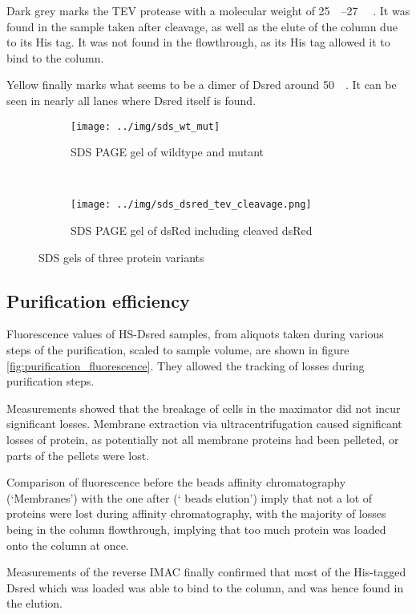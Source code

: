 Dark grey marks the TEV protease with a molecular weight of
\SIrange{25}{27}{\kilo\Da} \cite{pdb}. It was found in the sample taken after
cleavage, as well as the elute of the column due to its His tag. It was not
found in the flowthrough, as its His tag allowed it to bind to the column.

Yellow finally marks what seems to be a dimer of Dsred around
\SI{50}{\kilo\Da}. It can be seen in nearly all lanes where Dsred itself is
found.

\begin{figure*}
    \centering
    \begin{subfigure}{0.45\textwidth}
        \texttt{[image: ../img/sds\_wt\_mut]}
        \caption{SDS PAGE gel of wildtype and mutant}
        \label{fig:sds_wt_mut}
    \end{subfigure}
    ~
    \begin{subfigure}{0.45\textwidth}
        \texttt{[image: ../img/sds\_dsred\_tev\_cleavage.png]}
        \caption{SDS PAGE gel of dsRed including cleaved dsRed}
        \label{fig:sds_dsred_cleaved}
    \end{subfigure}
    \caption{SDS gels of three protein variants}
    \label{fig:sds}
\end{figure*}

\subsection{Purification efficiency}

Fluorescence values of HS-Dsred samples, from aliquots taken during various
steps of the purification, scaled to sample volume, are shown in figure
\ref{fig:purification_fluorescence}. They allowed the tracking of losses during
purification steps.

Measurements showed that the breakage of cells in the maximator did not incur
significant losses. Membrane extraction via ultracentrifugation caused
significant losses of protein, as potentially not all membrane proteins had
been pelleted, or parts of the pellets were lost.

Comparison of fluorescence before the  beads affinity chromatography
(`Membranes') with the one after (` beads elution') imply that not a lot
of proteins were lost during affinity chromatography, with the majority of
losses being in the column flowthrough, implying that too much protein was
loaded onto the column at once.

Measurements of the reverse IMAC finally confirmed that most of the His-tagged
Dsred which was loaded was able to bind to the column, and was hence found in
the elution.

